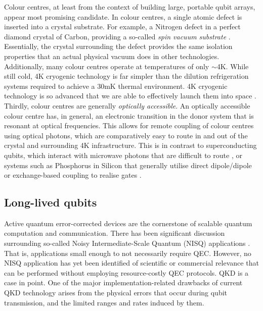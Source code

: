 \documentclass[twocolumn, aps, rmp, amsmath, amssymb, nofootinbib, superscriptaddress, longbibliography, floatfix, table-of-contents, eqsecnum]{revtex4-2}
\begin{document}
Colour centres, at least from the context of building large, portable qubit arrays, appear most promising candidate. In colour centres, a single atomic defect is inserted into a crystal substrate. For example, a Nitrogen defect in a perfect diamond crystal of Carbon, providing a so-called \textit{spin vacuum substrate} \cite{SD-Aharonovich:2011aa}. Essentially, the crystal surrounding the defect provides the same isolation properties that an actual physical vacuum does in other technologies. Additionally, many colour centres operate at temperatures of only $\sim$4K. While still cold, 4K cryogenic technology is far simpler than the dilution refrigeration systems required to achieve a 30mK thermal environment. 4K cryogenic technology is so advanced that we are able to effectively launch them into space \cite{SD-Gehrz2007}. Thirdly, colour centres are generally \textit{optically accessible}. An optically accessible colour centre has, in general, an electronic transition in the donor system that is resonant at optical frequencies. This allows for remote coupling of colour centres using optical photons, which are comparatively easy to route in and out of the crystal and surrounding 4K infrastructure. This is in contrast to superconducting qubits, which interact with microwave photons that are difficult to route \cite{SD-Kurpiers:2018aa}, or systems such as Phosphorus in Silicon that generally utilise direct dipole/dipole or exchange-based coupling to realise gates \cite{SD-Tosi:2017aa}. 

\subsection{Long-lived qubits}

Active quantum error-corrected devices are the cornerstone of scalable quantum computation and communication. There has been significant discussion surrounding so-called Noisy Intermediate-Scale Quantum (NISQ) applications \cite{SD-Preskill2018quantumcomputingin}. That is, applications small enough to not necessarily require QEC. However, no NISQ application has yet been identified of scientific or commercial relevance that can be performed without employing resource-costly QEC protocols. QKD is a case in point. One of the major implementation-related drawbacks of current QKD technology arises from the physical errors that occur during qubit transmission, and the limited ranges and rates induced by them. 
\end{document}

